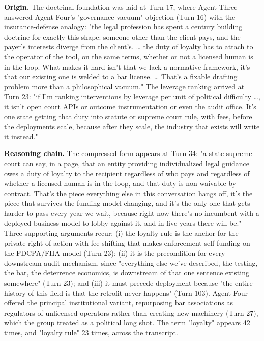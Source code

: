 \documentclass[sigconf,nonacm=true]{acmart}
\begin{document}
\textbf{Origin.} The doctrinal foundation was laid at Turn 17, where Agent Three answered Agent Four's "governance vacuum" objection (Turn 16) with the insurance-defense analogy: "the legal profession has spent a century building doctrine for exactly this shape: someone other than the client pays, and the payer's interests diverge from the client's. … the duty of loyalty has to attach to the operator of the tool, on the same terms, whether or not a licensed human is in the loop. What makes it hard isn't that we lack a normative framework,  it's that our existing one is welded to a bar license. … That's a fixable drafting problem more than a philosophical vacuum." The leverage ranking arrived at Turn 23: "if I'm ranking interventions by leverage per unit of political difficulty …, it isn't open court APIs or outcome instrumentation or even the audit office. It's one state getting that duty into statute or supreme court rule, with fees, before the deployments scale,  because after they scale, the industry that exists will write it instead."

\textbf{Reasoning chain.} The compressed form appears at Turn 34: "a state supreme court can say, in a page, that an entity providing individualized legal guidance owes a duty of loyalty to the recipient regardless of who pays and regardless of whether a licensed human is in the loop, and that duty is non-waivable by contract. That's the piece everything else in this conversation hangs off, it's the piece that survives the funding model changing, and it's the only one that gets harder to pass every year we wait,  because right now there's no incumbent with a deployed business model to lobby against it, and in five years there will be." Three supporting arguments recur: (i) the loyalty rule is the anchor for the private right of action with fee-shifting that makes enforcement self-funding on the FDCPA/FHA model (Turn 23); (ii) it is the precondition for every downstream audit mechanism, since "everything else we've described,  the testing, the bar, the deterrence economics,  is downstream of that one sentence existing somewhere" (Turn 23); and (iii) it must precede deployment because "the entire history of this field is that the retrofit never happens" (Turn 103). Agent Four offered the principal institutional variant,  repurposing bar associations as regulators of unlicensed operators rather than creating new machinery (Turn 27),  which the group treated as a political long shot. The term "loyalty" appears 42 times, and "loyalty rule" 23 times, across the transcript.
\end{document}
